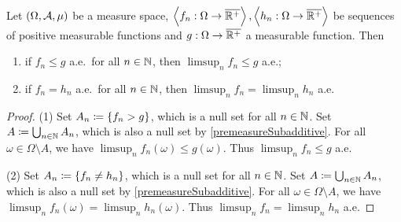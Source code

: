 \begin{lemma} \label{limsupBoundAE}
Let $\sSet{\Omega, \mathcal{A}, \mu}$ be a measure space, $\left\langle f_n: \Omega\to \overline{\mathbb{R}^+} \right\rangle, \left\langle h_n: \Omega\to \overline{\mathbb{R}^+} \right\rangle$ be sequences of positive measurable functions and $g: \Omega\to \overline{\mathbb{R}^+}$ a measurable function. Then
\begin{enumerate}
\item if $f_n \leq g$ a.e.\ for all $n\in \mathbb{N}$, then $\limsup_{n}f_n \leq g$ a.e.;
\item if $f_n = h_n$ a.e.\ for all $n\in \mathbb{N}$, then $\limsup_{n}f_n = \limsup_n h_n$ a.e.
\end{enumerate}
\end{lemma}
\begin{proof}
(1) Set $A_n \coloneqq \{f_n > g\}$, which is a null set for all $n\in \mathbb{N}$. Set $A \coloneqq \bigcup_{n\in \mathbb{N}}A_n$, which is also a null set by \ref{premeasureSubadditive}. For all $\omega\in \Omega\setminus A$, we have $\limsup_n f_n(\omega) \leq g(\omega)$. Thus $\limsup_{n}f_n \leq g$ a.e.

(2) Set $A_n \coloneqq \{f_n \neq h_n\}$, which is a null set for all $n\in \mathbb{N}$. Set $A \coloneqq \bigcup_{n\in \mathbb{N}}A_n$, which is also a null set by \ref{premeasureSubadditive}. For all $\omega\in \Omega\setminus A$, we have $\limsup_n f_n(\omega) = \limsup_n h_n(\omega)$. Thus $\limsup_{n}f_n = \limsup_n h_n$ a.e.
\end{proof}


